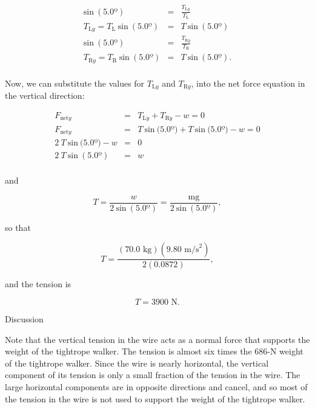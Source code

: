 \documentclass[
]{book}
\newenvironment{tinysection}{}{}
\begin{document}
\leavevmode\hypertarget{eip-id3367015}{}%
\[\begin{array}{lll}
{\text{sin}\ (5.0º)} & = & \frac{T_{\text{L}y}}{T_{\text{L}}} \\
{T_{\text{L}y} = T_{\text{L}}\ \text{sin}\ (5.0º)} & = & {T\ \text{sin}\ (5.0º)} \\
{\text{sin}\ (5.0º)} & = & \frac{T_{\text{R}y}}{T_{\text{R}}} \\
{T_{\text{R}y} = T_{\text{R}}\ \text{sin}\ (5.0º)} & = & {T\ \text{sin}\ (5.0º).} \\
\end{array}\]

Now, we can substitute the values for \(T_{\text{L}y}{}\) and
\(T_{\text{R}y}{}\), into the net force equation in the vertical
direction:

\leavevmode\hypertarget{eip-id2085200}{}%
\[\begin{array}{lll}
F_{\text{net}y} & = & {T_{\text{L}y} + T_{\text{R}y} - w = 0} \\
F_{\text{net}y} & = & {T\ \text{sin}\ (5.0º{) + T\ }\text{sin}\ (5.0º{{) - w} = 0}} \\
{2\ T\ \text{sin}\ (5.0º{) - w}} & = & 0 \\
{2\ T\ \text{sin}\ (5.0º)} & = & w \\
\end{array}\]

and

\leavevmode\hypertarget{eip-id2089830}{}%
\[{{T = \frac{w}{2\ \text{sin}\ (5.0º)}} = \frac{\text{mg}}{2\ \text{sin}\ (5.0º)}},\]

so that

\leavevmode\hypertarget{eip-id2121189}{}%
\[{T = \frac{(\text{70}\text{.}\text{0\ kg})(9\text{.}\text{80\ m/s}^{2})}{2(0\text{.}\text{0872})}},\]

and the tension is

\leavevmode\hypertarget{eip-id1633382}{}%
\[{T = \text{3900\ N}}.\]

\begin{tinysection}

{Discussion}

\end{tinysection}

Note that the vertical tension in the wire acts as a normal force that
supports the weight of the tightrope
walker.\textbf{} The tension is almost six
times the 686-N weight of the tightrope walker. Since the wire is nearly
horizontal, the vertical component of its tension is only a small
fraction of the tension in the wire. The large horizontal components are
in opposite directions and cancel, and so most of the tension in the
wire is not used to support the weight of the tightrope walker.
\end{document}
